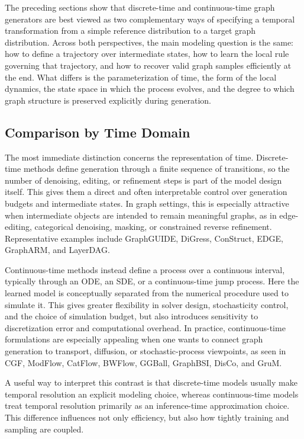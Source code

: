 \documentclass{article}
\begin{document}
The preceding sections show that discrete-time and continuous-time graph generators are best viewed as two complementary ways of specifying a temporal transformation from a simple reference distribution to a target graph distribution. Across both perspectives, the main modeling question is the same: how to define a trajectory over intermediate states, how to learn the local rule governing that trajectory, and how to recover valid graph samples efficiently at the end. What differs is the parameterization of time, the form of the local dynamics, the state space in which the process evolves, and the degree to which graph structure is preserved explicitly during generation.



\subsection{Comparison by Time Domain}
\label{sec:compare_time_domain}

The most immediate distinction concerns the representation of time. Discrete-time methods define generation through a finite sequence of transitions, so the number of denoising, editing, or refinement steps is part of the model design itself. This gives them a direct and often interpretable control over generation budgets and intermediate states. In graph settings, this is especially attractive when intermediate objects are intended to remain meaningful graphs, as in edge-editing, categorical denoising, masking, or constrained reverse refinement. Representative examples include GraphGUIDE, DiGress, ConStruct, EDGE, GraphARM, and LayerDAG.

Continuous-time methods instead define a process over a continuous interval, typically through an ODE, an SDE, or a continuous-time jump process. Here the learned model is conceptually separated from the numerical procedure used to simulate it. This gives greater flexibility in solver design, stochasticity control, and the choice of simulation budget, but also introduces sensitivity to discretization error and computational overhead. In practice, continuous-time formulations are especially appealing when one wants to connect graph generation to transport, diffusion, or stochastic-process viewpoints, as seen in CGF, ModFlow, CatFlow, BWFlow, GGBall, GraphBSI, DisCo, and GruM.

A useful way to interpret this contrast is that discrete-time models usually make temporal resolution an explicit modeling choice, whereas continuous-time models treat temporal resolution primarily as an inference-time approximation choice. This difference influences not only efficiency, but also how tightly training and sampling are coupled.
\end{document}
